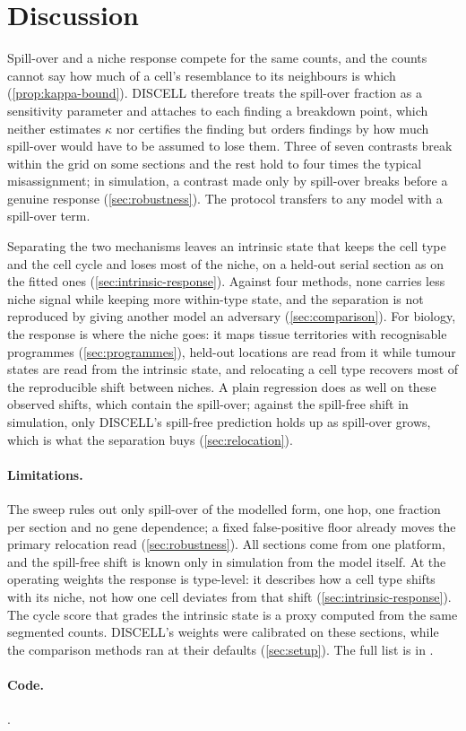 \section{Discussion}
\label{sec:discussion}

Spill-over and a niche response compete for the same counts, and the counts cannot say how much of a cell's resemblance to its neighbours is which (\cref{prop:kappa-bound}). DISCELL therefore treats the spill-over fraction as a sensitivity parameter and attaches to each finding a breakdown point, which neither estimates $\kappa$ nor certifies the finding but orders findings by how much spill-over would have to be assumed to lose them. Three of seven contrasts break within the grid on some sections and the rest hold to four times the typical misassignment; in simulation, a contrast made only by spill-over breaks before a genuine response (\cref{sec:robustness}). The protocol transfers to any model with a spill-over term.

Separating the two mechanisms leaves an intrinsic state that keeps the cell type and the cell cycle and loses most of the niche, on a held-out serial section as on the fitted ones (\cref{sec:intrinsic-response}). Against four methods, none carries less niche signal while keeping more within-type state, and the separation is not reproduced by giving another model an adversary (\cref{sec:comparison}). For biology, the response is where the niche goes: it maps tissue territories with recognisable programmes (\cref{sec:programmes}), held-out locations are read from it while tumour states are read from the intrinsic state, and relocating a cell type recovers most of the reproducible shift between niches. A plain regression does as well on these observed shifts, which contain the spill-over; against the spill-free shift in simulation, only DISCELL's spill-free prediction holds up as spill-over grows, which is what the separation buys (\cref{sec:relocation}).

\paragraph{Limitations.}
The sweep rules out only spill-over of the modelled form, one hop, one fraction per section and no gene dependence; a fixed false-positive floor already moves the primary relocation read (\cref{sec:robustness}). All sections come from one platform, and the spill-free shift is known only in simulation from the model itself. At the operating weights the response is type-level: it describes how a cell type shifts with its niche, not how one cell deviates from that shift (\cref{sec:intrinsic-response}). The cycle score that grades the intrinsic state is a proxy computed from the same segmented counts. DISCELL's weights were calibrated on these sections, while the comparison methods ran at their defaults (\cref{sec:setup}). The full list is in .

\paragraph{Code.} \codelink.
